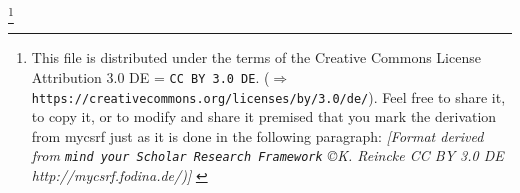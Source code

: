 %
%
%

\footnote{This file is distributed under the terms of the
Creative Commons License Attribution 3.0 DE = \texttt{CC BY 3.0 DE}.
($\Rightarrow$ \texttt{https://creativecommons.org/licenses/by/3.0/de/}).
Feel free to share it, to copy it, or to modify and share it
premised that you mark the derivation from mycsrf just as it
is done in the following paragraph:
\newline 
{ \tiny \itshape [Format derived from \texttt{mind your Scholar Research
Framework} \copyright K. Reincke CC BY 3.0 DE http://mycsrf.fodina.de/)] }}

